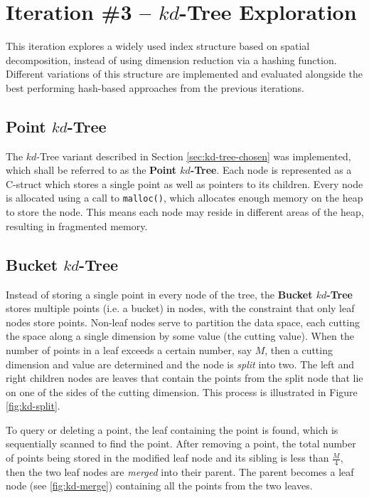 \section{Iteration \#3 -- $kd$-Tree Exploration}

This iteration explores a widely used index structure based on spatial decomposition, instead of using dimension reduction via a hashing function. Different variations of this structure are implemented and evaluated alongside the best performing hash-based approaches from the previous iterations.

\subsection{Point $kd$-Tree}

The $kd$-Tree variant described in Section \ref{sec:kd-tree-chosen} was implemented, which shall be referred to as the \textbf{Point $kd$-Tree}. Each node is represented as a C-struct which stores a single point as well as pointers to its children. Every node is allocated using a call to \texttt{malloc()}, which allocates enough memory on the heap to store the node. This means each node may reside in different areas of the heap, resulting in fragmented memory.

\subsection{Bucket $kd$-Tree}

Instead of storing a single point in every node of the tree, the \textbf{Bucket $kd$-Tree} stores multiple points (i.e. a bucket) in nodes, with the constraint that only leaf nodes store points. Non-leaf nodes serve to partition the data space, each cutting the space along a single dimension by some value (the cutting value). When the number of points in a leaf exceeds a certain number, say $M$, then a cutting dimension and value are determined and the node is \textit{split} into two. The left and right children nodes are leaves that contain the points from the split node that lie on one of the sides of the cutting dimension. This process is illustrated in Figure \ref{fig:kd-split}.

To query or deleting a point, the leaf containing the point is found, which is sequentially scanned to find the point. After removing a point, the total number of points being stored in the modified leaf node and its sibling is less than $\frac{M}{4}$, then the two leaf nodes are \textit{merged} into their parent. The parent becomes a leaf node (see \ref{fig:kd-merge}) containing all the points from the two leaves.

